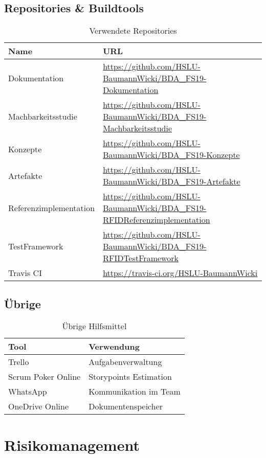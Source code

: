\subsection{Repositories \& Buildtools}
\begin{table}[h!]
	\begin{tabular}{p{} p{}}
		\hline
		\textbf{Name} & \textbf{URL} \\
		\hline
		Dokumentation & \url{https://github.com/HSLU-BaumannWicki/BDA_FS19-Dokumentation} \\
		\hline
		Machbarkeitsstudie & \url{https://github.com/HSLU-BaumannWicki/BDA_FS19-Machbarkeitsstudie} \\
		\hline
		Konzepte & \url{https://github.com/HSLU-BaumannWicki/BDA_FS19-Konzepte} \\
		\hline
		Artefakte & \url{https://github.com/HSLU-BaumannWicki/BDA_FS19-Artefakte} \\
		\hline
		Referenzimplementation & \url{https://github.com/HSLU-BaumannWicki/BDA_FS19-RFIDReferenzimplementation} \\
		\hline
		TestFramework & \url{https://github.com/HSLU-BaumannWicki/BDA_FS19-RFIDTestFramework} \\
		\hline	
		Travis CI &  \url{https://travis-ci.org/HSLU-BaumannWicki} \\
		\hline
	\end{tabular}
	\caption{Verwendete Repositories}
\end{table}

\subsection{Übrige}
\begin{table}[h!]
	\begin{tabular}{p{} p{}}
		\hline
		\textbf{Tool} & \textbf{Verwendung} \\
		\hline
		Trello & Aufgabenverwaltung \\
		\hline
		Scrum Poker Online & Storypoints Estimation\\
		\hline
		WhatsApp & Kommunikation im Team \\
		\hline
		OneDrive Online & Dokumentenspeicher \\
		\hline	
	\end{tabular}
	\caption{Übrige Hilfsmittel}
\end{table}

\clearpage

\section{Risikomanagement}

